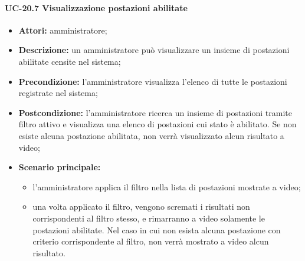 \paragraph{UC-20.7 Visualizzazione postazioni abilitate}
\begin{itemize}
    \item \textbf{Attori:} amministratore;
    \item \textbf{Descrizione:} un amministratore pu\`{o} visualizzare un insieme di postazioni abilitate censite nel sistema;
    \item \textbf{Precondizione:} l'amministratore visualizza l'elenco di tutte le postazioni registrate nel sistema;
    \item \textbf{Postcondizione:} l'amministratore ricerca un insieme di postazioni tramite filtro attivo e visualizza una elenco di postazioni cui stato è abilitato. Se non esiste alcuna postazione abilitata, non verrà visualizzato alcun risultato a video;
    \item \textbf{Scenario principale:}
    \begin{itemize}
        \item l'amministratore applica il filtro nella lista di postazioni mostrate a video;
        \item una volta applicato il filtro, vengono scremati i risultati non corrispondenti al filtro stesso, e rimarranno a video solamente le postazioni abilitate. Nel caso in cui non esista alcuna postazione con criterio corrispondente al filtro, non verrà mostrato a video alcun risultato.
    \end{itemize}
\end{itemize}

